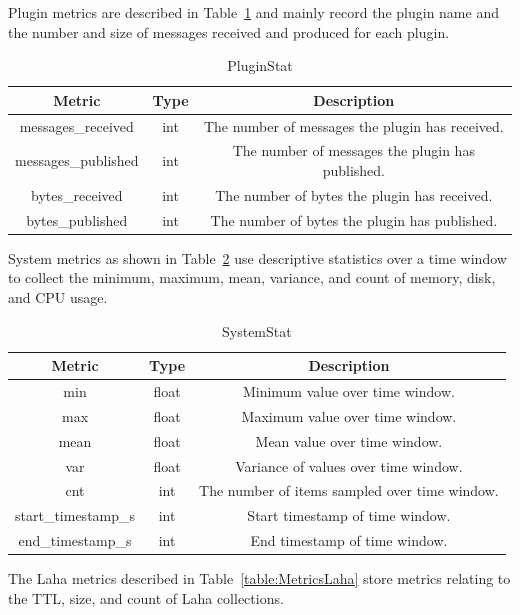 Plugin metrics are described in Table~\ref{table:MetricsPluginStat} and mainly record the plugin name and the number and size of messages received and produced for each plugin.

\begin{table}[H]
	\centering
	\caption{PluginStat}
	\begin{tabular}{|c|c|c|}
		\hline
		Metric & Type & Description \\
		\hline
		messages\_received & int & The number of messages the plugin has received. \\
		\hline
		messages\_published & int & The number of messages the plugin has published. \\
		\hline
		bytes\_received & int & The number of bytes the plugin has received. \\
		\hline
		bytes\_published & int & The number of bytes the plugin has published. \\
		\hline
	\end{tabular}
	\label{table:MetricsPluginStat}
\end{table}

System metrics as shown in Table~\ref{table:MetricsSystemStat} use descriptive statistics over a time window to collect the minimum, maximum, mean, variance, and count of memory, disk, and CPU usage.

\begin{table}[H]
	\centering
	\caption{SystemStat}
	\begin{tabular}{|c|c|c|}
		\hline
		Metric & Type & Description \\
		\hline
		min & float & Minimum value over time window. \\
		\hline
		max & float & Maximum value over time window. \\
		\hline
		mean & float & Mean value over time window. \\
		\hline
		var & float & Variance of values over time window. \\
		\hline
		cnt & int & The number of items sampled over time window. \\
		\hline
		start\_timestamp\_s & int & Start timestamp of time window. \\
		\hline
		end\_timestamp\_s & int & End timestamp of time window. \\
		\hline
	\end{tabular}
	\label{table:MetricsSystemStat}
\end{table}

The Laha metrics described in Table~\ref{table:MetricsLaha} store metrics relating to the TTL, size, and count of Laha collections.

